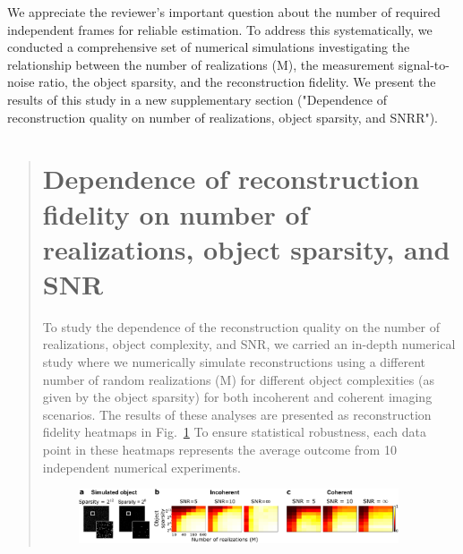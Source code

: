 \documentclass[12pt]{article}
\newenvironment{ourresponse}
    {\begin{tcolorbox}[width=\linewidth,breakable,enhanced,colback=gray!5,colframe=responsecolor!50,title=Response,left=5pt,right=5pt]}
    {\end{tcolorbox}}
\begin{document}
\begin{ourresponse}
    We appreciate the reviewer's important question about the number of required independent frames for reliable estimation. To address this systematically, we conducted a comprehensive set of numerical simulations investigating the relationship between the number of realizations (M), the measurement signal-to-noise ratio, the object sparsity, and the reconstruction fidelity. We present the results of this study in a new supplementary section ("Dependence of reconstruction quality on number of realizations, object sparsity, and SNRR").

    \begin{quote}
        \section*{Dependence of reconstruction fidelity on number of realizations, object sparsity, and SNR}

        To study the dependence of the reconstruction quality on the number of realizations, object complexity, and SNR, we carried an in-depth numerical study where we numerically simulate reconstructions using a different number of random realizations (M) for different object complexities (as given by the object sparsity) for both incoherent and coherent imaging scenarios.
        The results of these analyses are presented as reconstruction fidelity heatmaps in Fig.~\ref{fig_S8}
        To ensure statistical robustness, each data point in these heatmaps represents the average outcome from 10 independent numerical experiments.

        
        \begin{figure}[H]
            \centering
            \includegraphics[width=0.93\textwidth]{figures/figure_S8.pdf}
            \renewcommand{\thefigure}{S8}
            \label{fig_S8}
        \end{figure}


\end{quote}
\end{ourresponse}
\end{document}
